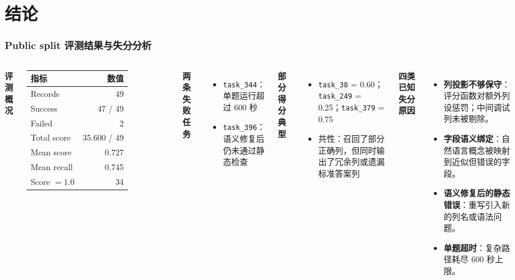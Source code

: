 \documentclass[11pt, aspectratio=169]{beamer}
\begin{document}

\section{结论}

\begin{frame}[t]
\frametitle{Public split 评测结果与失分分析}

\vspace{-0.3em}
\footnotesize
\begin{columns}[T]

\textbf{评测概况}

\vspace{0.2em}
\scriptsize
\begin{tabular}{@{}lr@{}}
\toprule
\textbf{指标} & \textbf{数值} \\
\midrule
Records & 49 \\
Success & 47 / 49 \\
Failed & 2 \\
Total score & 35.600 / 49 \\
Mean score & 0.727 \\
Mean recall & 0.745 \\
Score $= 1.0$ & 34 \\
\bottomrule
\end{tabular}

\vspace{0.5em}
\footnotesize
\textbf{两条失败任务}
\begin{itemize}
    \setlength\itemsep{0.05em}
    \item \texttt{task\_344}：单题运行超过 600 秒
    \item \texttt{task\_396}：语义修复后仍未通过静态检查
\end{itemize}

\textbf{部分得分典型}
\begin{itemize}
    \setlength\itemsep{0.05em}
    \item \texttt{task\_38} = 0.60；\texttt{task\_249} = 0.25；\texttt{task\_379} = 0.75
    \item 共性：召回了部分正确列，但同时输出了冗余列或遗漏标准答案列
\end{itemize}

\vspace{0.4em}
\textbf{四类已知失分原因}
\begin{itemize}
    \setlength\itemsep{0.05em}
    \item \textbf{列投影不够保守}：评分函数对额外列设惩罚；中间调试列未被剔除。
    \item \textbf{字段语义绑定}：自然语言概念被映射到近似但错误的字段。
    \item \textbf{语义修复后的静态错误}：重写引入新的列名或语法问题。
    \item \textbf{单题超时}：复杂路径耗尽 600 秒上限。
\end{itemize}


\end{columns}
\end{frame}
\end{document}
